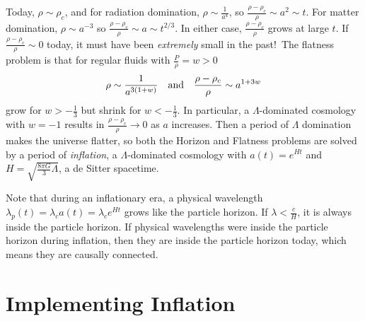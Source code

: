 \documentclass[a4paper,twoside,master.tex]{subfiles}
\begin{document}
Today, $ \rho \sim \rho_c $, and for radiation domination, $ \rho \sim \frac{1}{a^4} $, so $ \frac{\rho - \rho_c}{\rho} \sim a^2 \sim t $. For matter domination, $ \rho \sim a^{-3} $ so $ \frac{\rho - \rho_c}{\rho} \sim a \sim t^{2/3} $. In either case, $ \frac{\rho - \rho_c}{\rho} $ grows at large $ t $. If $ \frac{\rho - \rho_c}{\rho} \sim 0 $ today, it must have been \textit{extremely} small in the past!\ The flatness problem is that for regular fluids with $ \frac{P}{\rho} = w > 0 $
\begin{equation}
    \rho \sim \frac{1}{a^{3(1+w)}} \qand \frac{\rho - \rho_c}{\rho} \sim a^{1+3w} 
\end{equation}
grow for $ w > - \frac{1}{3} $ but shrink for $ w < - \frac{1}{3} $. In particular, a $ \Lambda $-dominated cosmology with $ w = -1 $ results in $ \frac{\rho - \rho_c}{\rho} \to 0 $ as $ a $ increases. Then a period of $ \Lambda $ domination makes the universe flatter, so both the Horizon and Flatness problems are solved by a period of \textit{inflation}, a $ \Lambda $-dominated cosmology with $ a(t) = e^{Ht} $ and $ H = \sqrt{\frac{8 \pi G}{3} \Lambda} $, a de Sitter spacetime.

Note that during an inflationary era, a physical wavelength $ \lambda_p(t) = \lambda_c a(t) = \lambda_c e^{Ht} $ grows like the particle horizon. If $ \lambda < \frac{c}{H} $, it is always inside the particle horizon. If physical wavelengths were inside the particle horizon during inflation, then they are inside the particle horizon today, which means they are causally connected.

\section{Implementing Inflation}\label{sec:implementing_inflation}
\end{document}
